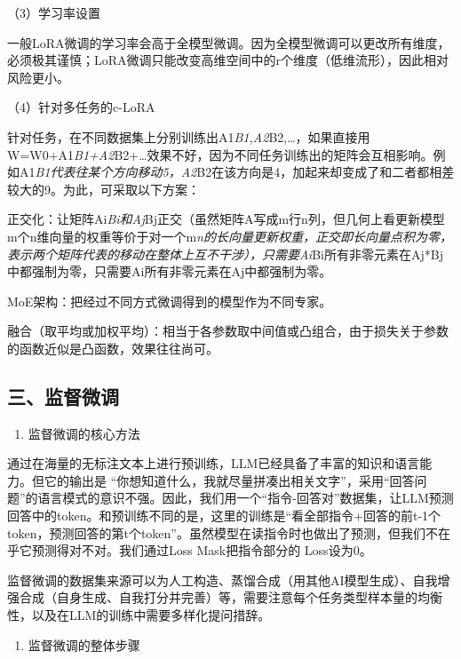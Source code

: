 （3）学习率设置

一般LoRA微调的学习率会高于全模型微调。因为全模型微调可以更改所有维度，必须极其谨慎；LoRA微调只能改变高维空间中的r个维度（低维流形），因此相对风险更小。

（4）针对多任务的c-LoRA

针对任务，在不同数据集上分别训练出A1\emph{B1,A2}B2,\ldots，如果直接用W=W0+A1\emph{B1+A2}B2+\ldots 效果不好，因为不同任务训练出的矩阵会互相影响。例如A1\emph{B1代表往某个方向移动5，A2}B2在该方向是4，加起来却变成了和二者都相差较大的9。为此，可采取以下方案：

正交化：让矩阵Ai\emph{Bi和Aj}Bj正交（虽然矩阵A写成m行n列，但几何上看更新模型m个n维向量的权重等价于对一个m\emph{n的长向量更新权重，正交即长向量点积为零，表示两个矩阵代表的移动在整体上互不干涉），只需要Ai}Bi所有非零元素在Aj*Bj中都强制为零，只需要Ai所有非零元素在Aj中都强制为零。

MoE架构：把经过不同方式微调得到的模型作为不同专家。

融合（取平均或加权平均）：相当于各参数取中间值或凸组合，由于损失关于参数的函数近似是凸函数，效果往往尚可。

\hypertarget{ux4e09ux76d1ux7763ux5faeux8c03}{%
\subsection{三、监督微调}\label{ux4e09ux76d1ux7763ux5faeux8c03}}

\begin{enumerate}
\def\labelenumi{\arabic{enumi}.}
\tightlist
\item
  监督微调的核心方法
\end{enumerate}

通过在海量的无标注文本上进行预训练，LLM已经具备了丰富的知识和语言能力。但它的输出是 ``你想知道什么，我就尽量拼凑出相关文字''，采用``回答问题''的语言模式的意识不强。因此，我们用一个``指令-回答对''数据集，让LLM预测回答中的token。和预训练不同的是，这里的训练是``看全部指令+回答的前t-1个token，预测回答的第t个token''。虽然模型在读指令时也做出了预测，但我们不在乎它预测得对不对。我们通过Loss Mask把指令部分的 Loss设为0。

监督微调的数据集来源可以为人工构造、蒸馏合成（用其他AI模型生成）、自我增强合成（自身生成、自我打分并完善）等，需要注意每个任务类型样本量的均衡性，以及在LLM的训练中需要多样化提问措辞。

\begin{enumerate}
\def\labelenumi{\arabic{enumi}.}
\setcounter{enumi}{1}
\tightlist
\item
  监督微调的整体步骤
\end{enumerate}


